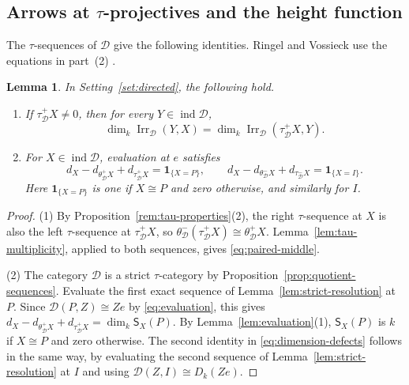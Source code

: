 \documentclass[a4paper,reqno,10pt]{amsart}
\newtheorem{lemma}[theorem]{Lemma}
\theoremstyle{definition}
\numberwithin{equation}{section}
\DeclareMathOperator{\ind}{ind}
\DeclareMathOperator{\Irr}{Irr}
\newcommand{\cD}{\mathcal D}
\newcommand{\indicator}{\mathbf 1}
\newcommand{\Dk}{D_k}
\begin{document}
\subsection{Arrows at \texorpdfstring{\(\tau\)}{tau}-projectives and the height function}\label{app:heights}
The \(\tau\)-sequences of \(\cD\) give the following identities. Ringel and
Vossieck use the equations in part~(2) \cite[Section~1, p.~217]{RV}.
\begin{lemma}\label{lem:quotient-identities}
In Setting~\ref{set:directed}, the following hold.
\begin{enumerate}
\item If \(\tau_{\cD}^+X\ne0\), then for every \(Y\in\ind\cD\),
\begin{equation}\label{eq:paired-middle}
 \dim_k\Irr_{\cD}(Y,X)=\dim_k\Irr_{\cD}(\tau_{\cD}^+X,Y).
\end{equation}
\item For \(X\in\ind\cD\), evaluation at \(e\) satisfies
\begin{equation}\label{eq:dimension-defects}
 d_X-d_{\theta_{\cD}^+X}+d_{\tau_{\cD}^+X}=\indicator_{\{X=P\}},\qquad
 d_X-d_{\theta_{\cD}^-X}+d_{\tau_{\cD}^-X}=\indicator_{\{X=I\}}.
\end{equation}
Here \(\indicator_{\{X=P\}}\) is one if \(X\cong P\) and zero
otherwise, and similarly for \(I\).
\end{enumerate}
\end{lemma}
\begin{proof}
(1) By Proposition~\ref{rem:tau-properties}(2), the right \(\tau\)-sequence at
\(X\) is also the left \(\tau\)-sequence at \(\tau_{\cD}^+X\), so
\(\theta_{\cD}^-(\tau_{\cD}^+X)\cong\theta_{\cD}^+X\).
Lemma~\ref{lem:tau-multiplicity}, applied to both sequences, gives
\eqref{eq:paired-middle}.

(2) The category \(\cD\) is a strict \(\tau\)-category by
Proposition~\ref{prop:quotient-sequences}. Evaluate the first exact
sequence of Lemma~\ref{lem:strict-resolution} at \(P\). Since
\(\cD(P,Z)\cong Ze\) by \eqref{eq:evaluation}, this gives
\(d_X-d_{\theta_{\cD}^+X}+d_{\tau_{\cD}^+X}=\dim_k\mathsf S_X(P)\). By
Lemma~\ref{lem:evaluation}(1), \(\mathsf S_X(P)\) is \(k\) if \(X\cong P\) and zero otherwise. The
second identity in \eqref{eq:dimension-defects} follows in the same way,
by evaluating the second sequence of Lemma~\ref{lem:strict-resolution} at
\(I\) and using \(\cD(Z,I)\cong\Dk(Ze)\).
\end{proof}
\end{document}

